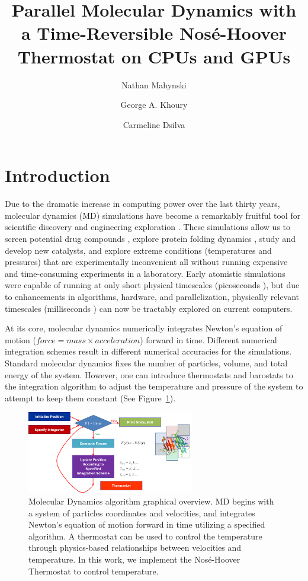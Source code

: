 \documentclass[12pt]{article}
\title{Parallel Molecular Dynamics with a Time-Reversible Nos\'{e}-Hoover Thermostat on CPUs and GPUs}
\author{Nathan Mahynski \and George A. Khoury \and Carmeline Dsilva}
\begin{document}
\maketitle

\section{Introduction}


Due to the dramatic increase in computing power over the last thirty years, molecular dynamics (MD) simulations have become a remarkably fruitful tool for scientific discovery and engineering exploration \cite{Karplus2002,Levitt2001}.
%
These simulations allow us to screen potential drug compounds \cite{Jorgensen2004}, explore protein folding dynamics \cite{Duan1998,Shaw2010,Piana2013,Lindorff-Larsen2011}, study \cite{Boero1998} and develop \cite{Zipoli2010} new catalysts, and explore extreme conditions (temperatures and pressures) that are experimentally inconvenient all without running expensive and time-consuming experiments in a laboratory.
%
Early atomistic simulations were capable of running at only short physical timescales (picoseconds \cite{Karplus1979}), but due to enhancements in algorithms, hardware, and parallelization, physically relevant timescales (milliseconds \cite{Kohlhoff2014}) can now be tractably explored on current computers.

At its core, molecular dynamics numerically integrates Newton's equation of motion ($force = mass \times acceleration$) forward in time.
%
Different numerical integration schemes result in different numerical accuracies for the simulations.
%
Standard molecular dynamics fixes the number of particles, volume, and total energy of the system.
%
However, one can introduce thermostats and barostats to the integration algorithm to adjust the temperature and pressure of the system to attempt to keep them constant (See Figure~\ref{fig:mdfigure}).

\begin{figure}
\centering
\includegraphics[width=0.65\textwidth]{mdfigure.png}
\caption{Molecular Dynamics algorithm graphical overview. MD begins with a system of particles coordinates and velocities, and integrates Newton's equation of motion forward in time utilizing a specified algorithm. A thermostat can be used to control the temperature through physics-based relationships between velocities and temperature. In this work, we implement the Nos\'{e}-Hoover Thermostat to control temperature.}
\label{fig:mdfigure}
\end{figure}
\end{document}
